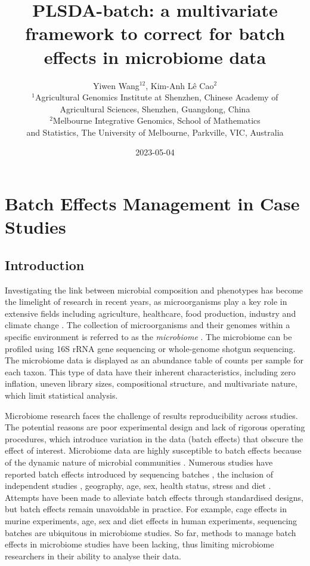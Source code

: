 \documentclass[
]{book}
\title{PLSDA-batch: a multivariate framework to correct for batch effects in microbiome data}
\author{Yiwen Wang\(^{12}\), Kim-Anh Lê Cao\(^2\)\\
\(^1\)Agricultural Genomics Institute at Shenzhen, Chinese Academy of\\
Agricultural Sciences, Shenzhen, Guangdong, China\\
\(^2\)Melbourne Integrative Genomics, School of Mathematics\\
and Statistics, The University of Melbourne, Parkville, VIC, Australia}
\date{2023-05-04}
\begin{document}
\maketitle

{
\setcounter{tocdepth}{3}
\tableofcontents
}
\hypertarget{batch-effects-management-in-case-studies}{%
\chapter{Batch Effects Management in Case Studies}\label{batch-effects-management-in-case-studies}}

\hypertarget{introduction}{%
\section{Introduction}\label{introduction}}

Investigating the link between microbial composition and phenotypes has become the limelight of research in recent years, as microorganisms play a key role in extensive fields including agriculture, healthcare, food production, industry and climate change \citep{wang2020characterizing, ray2020microbe, fan2020gut, poirier2020integrating}. The collection of microorganisms and their genomes within a specific environment is referred to as the \emph{microbiome} \citep{marchesi2015vocabulary}. The microbiome can be profiled using 16S rRNA gene sequencing or whole-genome shotgun sequencing. The microbiome data is displayed as an abundance table of counts per sample for each taxon. This type of data have their inherent characteristics, including zero inflation, uneven library sizes, compositional structure, and multivariate nature, which limit statistical analysis.

Microbiome research faces the challenge of results reproducibility across studies. The potential reasons are poor experimental design and lack of rigorous operating procedures, which introduce variation in the data (batch effects) that obscure the effect of interest. Microbiome data are highly susceptible to batch effects because of the dynamic nature of microbial communities \citep{wang2020managing}. Numerous studies have reported batch effects introduced by sequencing batches \citep{hieken2016microbiome}, the inclusion of independent studies \citep{duvallet2017meta}, geography, age, sex, health status, stress and diet \citep{gibson2004dietary, lozupone2013meta, haro2016intestinal, kim2017optimizing}. Attempts have been made to alleviate batch effects through standardised designs, but batch effects remain unavoidable in practice. For example, cage effects in murine experiments, age, sex and diet effects in human experiments, sequencing batches are ubiquitous in microbiome studies. So far, methods to manage batch effects in microbiome studies have been lacking, thus limiting microbiome researchers in their ability to analyse their data.
\end{document}
